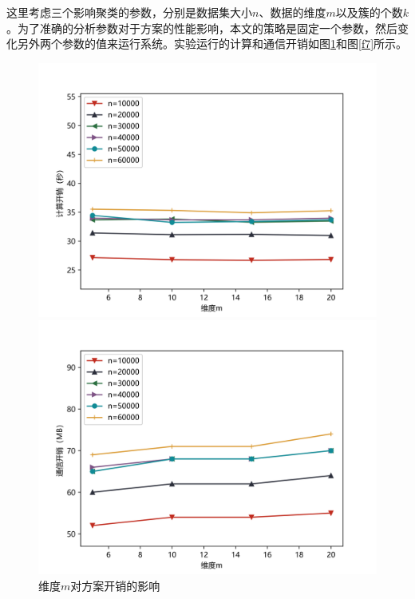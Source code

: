 这里考虑三个影响聚类的参数，分别是数据集大小$ n $、数据的维度$ m $以及簇的个数$ k $。为了准确的分析参数对于方案的性能影响，本文的策略是固定一个参数，然后变化另外两个参数的值来运行系统。实验运行的计算和通信开销如图\ref{f6}和图\ref{f7}所示。

\begin{figure}[htbp] %
	\begin{minipage}[t]{0.5\linewidth}
		\includegraphics[width=\linewidth]{img/newm_time.png}
		
	\end{minipage}%
	\hfill%
	\begin{minipage}[t]{0.5\linewidth}
		\includegraphics[width=\linewidth]{img/newm_comm.png}
		
	\end{minipage}
	\caption{维度$ m $对方案开销的影响}
	\label{f6}
\end{figure}

